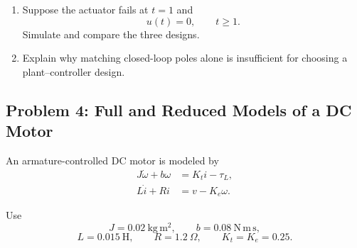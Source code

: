 \begin{enumerate}
    \item Suppose the actuator fails at $t=1$ and
    \begin{equation}
    u(t)=0,
    \qquad
    t\geq1.
    \end{equation}
    Simulate and compare the three designs.

    \item Explain why matching closed-loop poles alone is insufficient for
    choosing a plant--controller design.
\end{enumerate}


\subsection*{Problem 4: Full and Reduced Models of a DC Motor}

An armature-controlled DC motor is modeled by
\begin{align}
J\dot{\omega}+b\omega
&=
K_ti-\tau_L,
\\
L\dot{i}+Ri
&=
v-K_e\omega.
\end{align}

Use
\begin{equation}
J=0.02~\mathrm{kg\,m^2},
\qquad
b=0.08~\mathrm{N\,m\,s},
\end{equation}
\begin{equation}
L=0.015~\mathrm{H},
\qquad
R=1.2~\Omega,
\qquad
K_t=K_e=0.25.
\end{equation}

